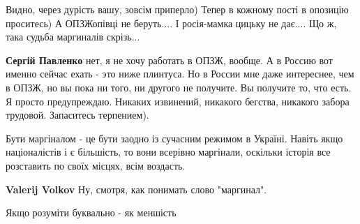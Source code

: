\begin{itemize}
 

Видно, через дурість вашу, зовсім приперло)
Тепер в кожному пості в опозицію проситесь)
А ОПЗЖопівці не беруть....
І росія-мамка цицьку не дає....
Що ж, така судьба маргиналів скрізь...

\begin{itemize}
 
\textbf{Сергій Павленко} нет, я не хочу работать в ОПЗЖ, вообще. А в Россию вот именно сейчас ехать - это ниже плинтуса. Но в России мне даже интереснее, чем в ОПЗЖ, но вы пока ни того, ни другого не получите. Вы получите то, что есть. Я просто предупреждаю. Никаких извинений, никакого бегства, никакого забора трудовой. Запаситесь терпением).

 
Бути маргіналом - це бути заодно із сучасним режимом в Україні.
Навіть якщо націоналістів і є більшість, то вони всерівно маргінали,
оскільки історія все розставить по своїх місцях, всім воздасть.

 
\textbf{Valerij Volkov} Ну, смотря, как понимать слово "маргинал".

 
Якщо розуміти буквально - як меншість


\end{itemize}
\end{itemize}
